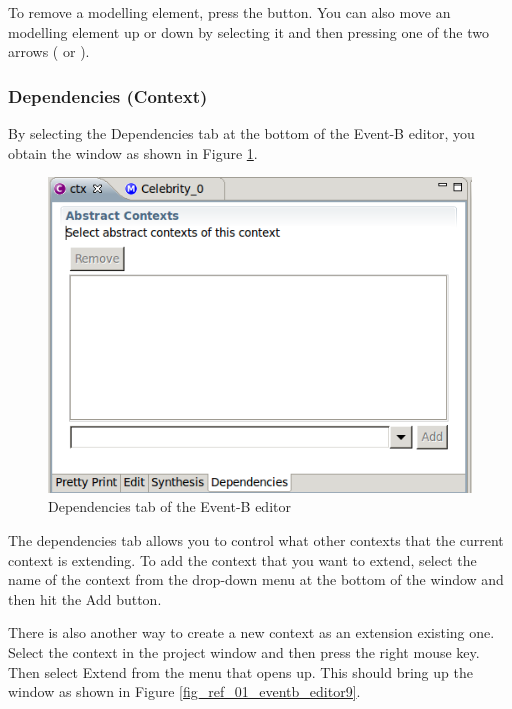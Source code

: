 To remove a modelling element, press the  button. You can also move an modelling element up or down by selecting it and then pressing one of the two arrows ( or ).

\subsubsection{Dependencies (Context)}

By selecting the \textsf{Dependencies} tab at the bottom of the Event-B editor, you obtain the window as shown in Figure \ref{fig_ref_01_eventb_editor8}.

\begin{figure}[!ht]
\begin{center}
	\includegraphics{img/reference/ref_01_eventb_editor8.png}
	\caption{Dependencies tab of the Event-B editor}
	\label{fig_ref_01_eventb_editor8}
\end{center}
\end{figure}

The dependencies tab allows you to control what other contexts that the current context is extending. To add the context that you want to extend, select the name of the context from the drop-down menu at the bottom of the window and then hit the \textsf{Add} button.

There is also another way to create a new context as an extension existing one. Select the context in the project window and then press the right mouse key. Then select \textsf{Extend} from the menu that opens up. This should bring up the window as shown in Figure \ref{fig_ref_01_eventb_editor9}.

